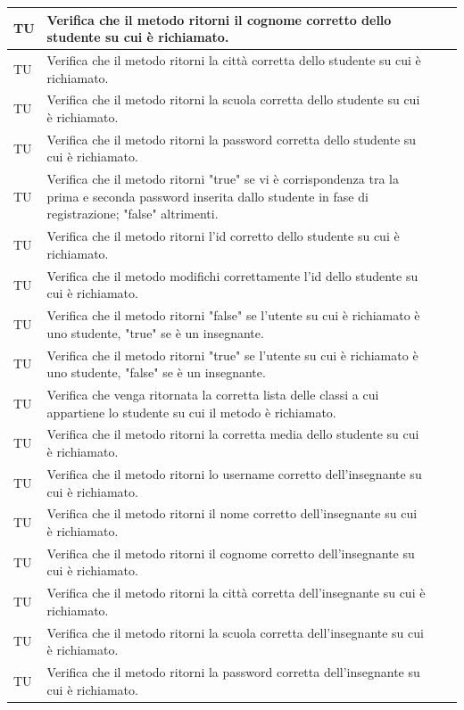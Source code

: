 \begin{longtable}{|>{\centering\arraybackslash}m{1.6cm}|>{\centering\arraybackslash}m{6.41cm}|>{\centering\arraybackslash}m{3.1cm}| c |}
		TU & Verifica che il metodo ritorni il cognome corretto dello studente su cui è richiamato. \\ \hline
		TU & Verifica che il metodo ritorni la città corretta dello studente su cui è richiamato.\\ \hline
		TU & Verifica che il metodo ritorni la scuola corretta dello studente su cui è richiamato. \\ \hline
		TU & Verifica che il metodo ritorni la password corretta dello studente su cui è richiamato. \\ \hline
		TU & Verifica che il metodo ritorni "true" se vi è corrispondenza tra la prima e seconda password inserita dallo studente in fase di registrazione; "false" altrimenti.  \\ \hline
		TU & Verifica che il metodo ritorni l'id corretto dello studente su cui è richiamato.\\ \hline
		TU & Verifica che il metodo modifichi correttamente l'id dello studente su cui è richiamato. \\ \hline
		TU & Verifica che il metodo ritorni "false" se l'utente su cui è richiamato è uno studente, "true" se è un insegnante. \\ \hline
		TU & Verifica che il metodo ritorni "true" se l'utente su cui è richiamato è uno studente, "false" se è un insegnante. \\ \hline
		TU & Verifica che venga ritornata la corretta lista delle classi a cui appartiene lo studente su cui il metodo è richiamato.  \\ \hline
		TU & Verifica che il metodo ritorni la corretta media dello studente su cui è richiamato. \\ \hline
		TU & Verifica che il metodo ritorni lo username corretto dell'insegnante su cui è richiamato.\\ \hline
		TU & Verifica che il metodo ritorni il nome corretto dell'insegnante su cui è richiamato.  \\ \hline
		TU & Verifica che il metodo ritorni il cognome corretto dell'insegnante su cui è richiamato. \\ \hline
		TU & Verifica che il metodo ritorni la città corretta dell'insegnante su cui è richiamato.\\ \hline
		TU & Verifica che il metodo ritorni la scuola corretta dell'insegnante su cui è richiamato. \\ \hline
		TU & Verifica che il metodo ritorni la password corretta dell'insegnante su cui è richiamato. \\ \hline

\end{longtable}
